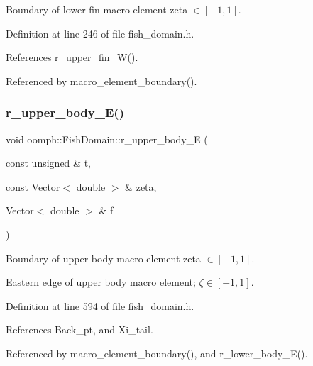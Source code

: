 Boundary of lower fin macro element zeta $ \in [-1,1] $. 



Definition at line 246 of file fish\+\_\+domain.\+h.



References r\+\_\+upper\+\_\+fin\+\_\+\+W().



Referenced by macro\+\_\+element\+\_\+boundary().

\mbox{\label{classoomph_1_1FishDomain_a47bdf57eebfa025628e70da2a1ab9e19}} 
\subsubsection{\texorpdfstring{r\+\_\+upper\+\_\+body\+\_\+\+E()}{r\_upper\_body\_E()}}
{\footnotesize\ttfamily void oomph\+::\+Fish\+Domain\+::r\+\_\+upper\+\_\+body\+\_\+E (\begin{DoxyParamCaption}\item[{const unsigned \&}]{t,  }\item[{const Vector$<$ double $>$ \&}]{zeta,  }\item[{Vector$<$ double $>$ \&}]{f }\end{DoxyParamCaption})\hspace{0.3cm}{\ttfamily [private]}}



Boundary of upper body macro element zeta $ \in [-1,1] $. 

Eastern edge of upper body macro element; $ \zeta \in [-1,1] $. 

Definition at line 594 of file fish\+\_\+domain.\+h.



References Back\+\_\+pt, and Xi\+\_\+tail.



Referenced by macro\+\_\+element\+\_\+boundary(), and r\+\_\+lower\+\_\+body\+\_\+\+E().

\mbox{\label{classoomph_1_1FishDomain_a45f1d71d2cf6f4102486b04362ba8b0b}} 
